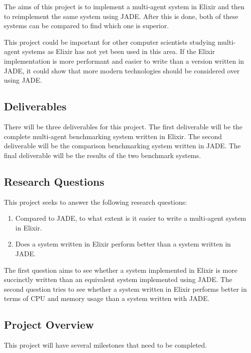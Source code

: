 The aims of this project is to implement a multi-agent system in Elixir and then to reimplement the same system using JADE\@.
After this is done, both of these systems can be compared to find which one is superior.

This project could be important for other computer scientists studying multi-agent systems as Elixir has not yet been used in this area.
If the Elixir implementation is more performant and easier to write than a version written in JADE, it could show that more modern technologies should be considered over using JADE\@.

\subsection{Deliverables}

There will be three deliverables for this project.
The first deliverable will be the complete multi-agent benchmarking system written in Elixir.
The second deliverable will be the comparison benchmarking system written in JADE\@.
The final deliverable will be the results of the two benchmark systems.

\subsection{Research Questions}

This project seeks to answer the following research questions:

\begin{enumerate}
    \item Compared to JADE, to what extent is it easier to write a multi-agent system in Elixir.
    \item Does a system written in Elixir perform better than a system written in JADE\@.
\end{enumerate}

The first question aims to see whether a system implemented in Elixir is more succinctly written than an equivalent system implemented using JADE\@.
The second question tries to see whether a system written in Elixir performs better in terms of CPU and memory usage than a system written with JADE\@.

\subsection{Project Overview}

This project will have several milestones that need to be completed.

